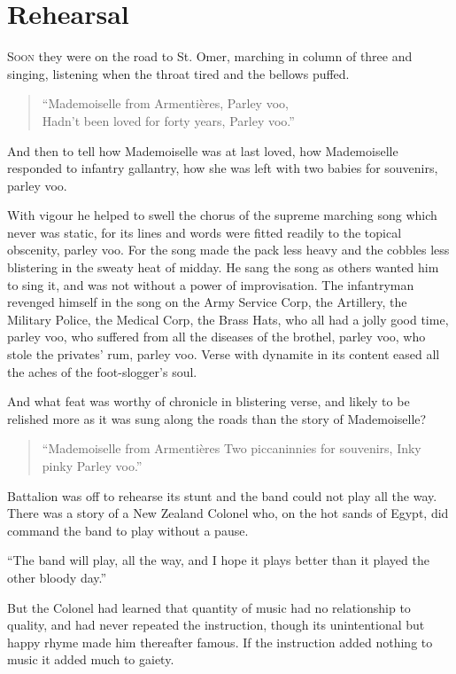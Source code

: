 \chapter*{\textsf{Rehearsal}}

S\textsc{oon} they were on the road to St. Omer, marching in column of three and singing, listening when the throat tired and the bellows puffed.

\begin{verse}
``Mademoiselle from Armenti\`{e}res, Parley voo, \\
Hadn't been loved for forty years, Parley voo.''
\end{verse}

And then to tell how Mademoiselle was at last loved, how Mademoiselle responded to infantry gallantry, how she was left with two babies for souvenirs, parley voo.

With vigour he helped to swell the chorus of the supreme marching song which never was static, for its lines and words were fitted readily to the topical obscenity, parley voo. For the song made the pack less heavy and the cobbles less blistering in the sweaty heat of midday. He sang the song as others wanted him to sing it, and was not without a power of improvisation. The infantryman revenged himself in the song on the Army Service Corp, the Artillery, the Military Police, the Medical Corp, the Brass Hats, who all had a jolly good time, parley voo, who suffered from all the diseases of the brothel, parley voo, who stole the privates' rum, parley voo. Verse with dynamite in its content eased all the aches of the foot-slogger's soul.

And what feat was worthy of chronicle in blistering verse, and likely to be relished more as it was sung along the roads than the story of Mademoiselle?

\begin{verse}
``Mademoiselle from Armenti\`{e}res
Two piccaninnies for souvenirs,
Inky pinky Parley voo.''
\end{verse}

Battalion was off to rehearse its stunt and the band could not play all the way. There was a story of a New Zealand Colonel who, on the hot sands of Egypt, did command the band to play without a pause.

``The band will play, all the way, and I hope it plays better than it played the other bloody day.''

But the Colonel had learned that quantity of music had no relationship to quality, and had never repeated the instruction, though its unintentional but happy rhyme made him thereafter famous. If the instruction added nothing to music it added much to gaiety.

